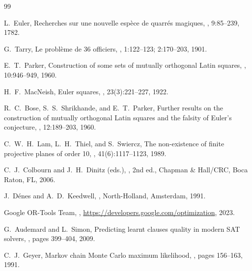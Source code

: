 \documentclass[11pt,a4paper]{article}
\theoremstyle{remark}
\begin{document}
\begin{thebibliography}{99}

L.~Euler,
\newblock Recherches sur une nouvelle esp\`{e}ce de quarr\'{e}s magiques,
, 9:85--239, 1782.

G.~Tarry,
\newblock Le probl\`{e}me de 36 officiers,
, 1:122--123; 2:170--203, 1901.

E.~T.~Parker,
\newblock Construction of some sets of mutually orthogonal Latin squares,
, 10:946--949,
  1960.

H.~F.~MacNeish,
\newblock Euler squares,
, 23(3):221--227, 1922.

R.~C.~Bose, S.~S.~Shrikhande, and E.~T.~Parker,
\newblock Further results on the construction of mutually orthogonal Latin
  squares and the falsity of Euler's conjecture,
, 12:189--203, 1960.

C.~W.~H.~Lam, L.~H.~Thiel, and S.~Swiercz,
\newblock The non-existence of finite projective planes of order 10,
, 41(6):1117--1123, 1989.

C.~J.~Colbourn and J.~H.~Dinitz (eds.),
, 2nd ed.,
\newblock Chapman \& Hall/CRC, Boca Raton, FL, 2006.

J.~D\'{e}nes and A.~D.~Keedwell,
,
\newblock North-Holland, Amsterdam, 1991.

Google OR-Tools Team,
,
\newblock \url{https://developers.google.com/optimization}, 2023.

G.~Audemard and L.~Simon,
\newblock Predicting learnt clauses quality in modern SAT solvers,
, pages 399--404, 2009.

C.~J.~Geyer,
\newblock Markov chain Monte Carlo maximum likelihood,
, pages
  156--163, 1991.


\end{thebibliography}
\end{document}
